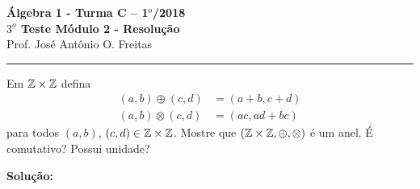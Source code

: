 \documentclass[12pt]{article}
\begin{document}


\begin{center}
{\Large\bf {\'A}lgebra 1 - Turma C -- 1$^{o}$/2018} \\ \vspace{9pt} {\large\bf
  $3^{\underline{o}}$ Teste M\'odulo 2 - Resolu\c{c}\~ao}\\
\vspace{9pt} Prof. Jos{\'e} Ant{\^o}nio O. Freitas
\end{center}
\hrule

\vspace{.6cm}

\questao Em $\mathbb{Z} \times \mathbb{Z}$ defina
\begin{align*}
	(a, b) \oplus (c,d) &= (a + b, c + d)\\
	(a, b) \otimes (c, d) &= (ac, ad + bc)
\end{align*}
para todos $(a, b)$, $(c, d) \in \mathbb{Z} \times \mathbb{Z}$. Mostre que $(\mathbb{Z} \times \mathbb{Z}, \oplus, \otimes)$ \'e um anel. \'E comutativo? Possui unidade?

\noindent\textbf{Solu\c{c}\~ao:}
\end{document}
